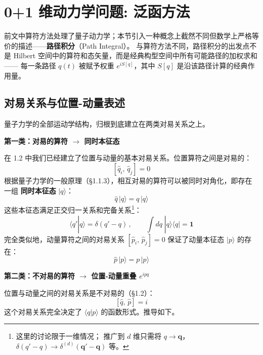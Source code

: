 \section{0+1 维动力学问题: 泛函方法}

前文中算符方法处理了量子动力学；本节引入一种概念上截然不同但数学上严格等价的描述——\textbf{路径积分}（Path Integral）。
与算符方法不同，路径积分的出发点不是 Hilbert 空间中的算符和态矢量，而是经典构型空间中所有可能路径的加权求和——
每一条路径 $q(t)$ 被赋予权重 $e^{iS[q]}$，其中 $S[q]$ 是沿该路径计算的经典作用量。


\subsection*{对易关系与位置-动量表述}

量子力学的全部运动学结构，归根到底建立在两类对易关系之上。

\vspace{6pt}
\noindent\textbf{第一类：对易的算符 $\longrightarrow$ 同时本征态}

在 1.2 中我们已经建立了位置与动量的基本对易关系。位置算符之间是对易的：
\begin{equation}\label{eq:qq-comm}
  [\hat{q}_i,\,\hat{q}_j] = 0
\end{equation}
根据量子力学的一般原理（\S1.1.3），相互对易的算符可以被同时对角化，即存在一组
\textbf{同时本征态} $|q\rangle$：
\begin{equation}\label{eq:q-eigen}
  \hat{q}\,|q\rangle = q\,|q\rangle
\end{equation}
这些本征态满足正交归一关系和完备关系\footnote{这里的讨论限于一维情况；
推广到 $d$ 维只需将 $q \to \mathbf{q}$，$\delta(q'-q) \to \delta^{(d)}(\mathbf{q}'-\mathbf{q})$ 等。}：
\begin{equation}\label{eq:q-complete}
  \langle q'|q\rangle = \delta(q'-q)\,,\qquad
  \int dq\;|q\rangle\langle q| = \mathbf{1}
\end{equation}
完全类似地，动量算符之间的对易关系 $[\hat{p}_i,\,\hat{p}_j] = 0$ 保证了动量本征态 $|p\rangle$ 的存在：
\begin{equation}\label{eq:p-eigen}
  \hat{p}\,|p\rangle = p\,|p\rangle
\end{equation}

\vspace{8pt}
\noindent\textbf{第二类：不对易的算符 $\longrightarrow$ 位置-动量重叠 $e^{ipq}$}

位置与动量之间的对易关系是不对易的（\S1.2）：
\begin{equation}\label{eq:qp-comm}
  [\hat{q},\,\hat{p}] = i
\end{equation}
这个对易关系完全决定了 $\langle q|p\rangle$ 的函数形式。推导如下。

